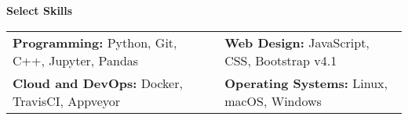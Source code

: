 \documentclass[11pt]{article}
\newcommand{\cvsection}[1]
{
\begin{center}
    \large\textcolor{sectcol}{\textbf{#1}}
\end{center}
}
\begin{document}
\vspace{-15pt}

\cvsection{Select Skills}

\begin{tabular}{ll}
\textbf{Programming:} Python, Git, C++, Jupyter, Pandas & \textbf{Web Design:} JavaScript, CSS, Bootstrap v4.1 \\
\textbf{Cloud and DevOps:} Docker, TravisCI, Appveyor &
\textbf{Operating Systems:} Linux, macOS, Windows
\end{tabular}

\end{document}
